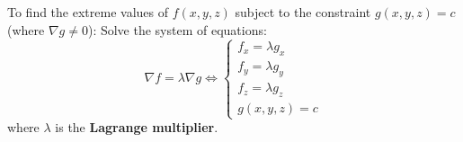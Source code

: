 \begin{theorem}
To find the extreme values of $f(x,y,z)$ subject to the constraint $g(x,y,z) = c$ (where $\nabla g \ne 0$):
Solve the system of equations:
\begin{equation}
\nabla f = \lambda \nabla g \iff \begin{cases}
f_x = \lambda g_x \\
f_y = \lambda g_y \\
f_z = \lambda g_z \\
g(x,y,z) = c
\end{cases}
\end{equation}
where $\lambda$ is the \textbf{Lagrange multiplier}.
\end{theorem}

